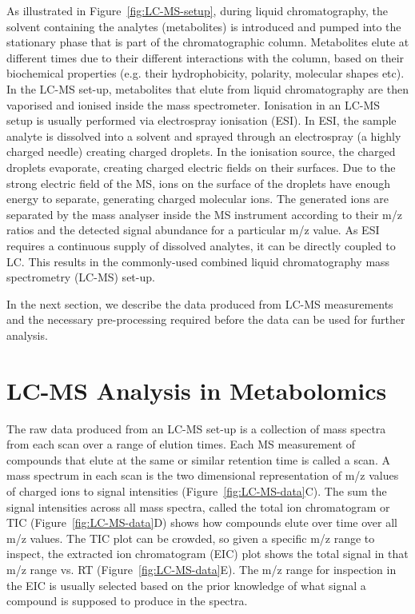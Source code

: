As illustrated in Figure~\ref{fig:LC-MS-setup}, during liquid chromatography, the solvent containing the analytes (metabolites) is introduced and pumped into the stationary phase that is part of the chromatographic column. Metabolites elute at different times due to their different interactions with the column, based on their biochemical properties (e.g. their hydrophobicity, polarity, molecular shapes etc). In the LC-MS set-up, metabolites that elute from liquid chromatography are then vaporised and ionised inside the mass spectrometer. Ionisation in an LC-MS setup is usually performed via electrospray ionisation (ESI). In ESI, the sample analyte is dissolved into a solvent and sprayed through an electrospray (a highly charged needle) creating charged droplets. In the ionisation source, the charged droplets evaporate, creating charged electric fields on their surfaces. Due to the strong electric field of the MS, ions on the surface of the droplets have enough energy to separate, generating charged molecular ions. The generated ions are separated by the mass analyser inside the MS instrument according to their m/z ratios and the detected signal abundance for a particular m/z value. As ESI requires a continuous supply of dissolved analytes, it can be directly coupled to LC. This results in the commonly-used combined liquid chromatography mass spectrometry (LC-MS) set-up. 

In the next section, we describe the data produced from LC-MS measurements and the necessary pre-processing required before the data can be used for further analysis.

\section{LC-MS Analysis in Metabolomics}

The raw data produced from an LC-MS set-up is a collection of mass spectra from each scan over a range of elution times. Each MS measurement of compounds that elute at the same or similar retention time is called a scan. A mass spectrum in each scan is the two dimensional representation of m/z values of charged ions to signal intensities (Figure~\ref{fig:LC-MS-data}C). The sum the signal intensities across all mass spectra, called the total ion chromatogram or TIC (Figure~\ref{fig:LC-MS-data}D) shows how compounds elute over time over all m/z values. The TIC plot can be crowded, so given a specific m/z range to inspect, the extracted ion chromatogram (EIC) plot shows the total signal in that m/z range vs. RT (Figure~\ref{fig:LC-MS-data}E). The m/z range for inspection in the EIC is usually selected based on the prior knowledge of what signal a compound is supposed to produce in the spectra.

